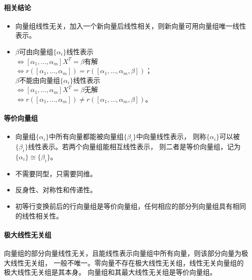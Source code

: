 \documentclass[
12pt, %
a4paper, 
oneside, %
headinclude,footinclude, %
]{scrartcl}
\begin{document}
\paragraph{相关结论}
\begin{itemize}
\item 向量组线性无关，加入一个新向量后线性相关，则新向量可用向量组唯一线性表示。
\item $ \beta $可由向量组$ \{\alpha_i\} $线性表示 \\
$ \Leftrightarrow $$ [\alpha_1, \dots, \alpha_m]X^T = \beta $有解 \\
$ \Leftrightarrow $$ r([\alpha_1, \dots, \alpha_m]) = r([\alpha_1, \dots, \alpha_m, \beta]) $； \\
$ \beta $不能由向量组$ \{\alpha_i\} $线性表示 \\
$ \Leftrightarrow $$ [\alpha_1, \dots, \alpha_m]X^T = \beta $无解 \\
$ \Leftrightarrow $$ r([\alpha_1, \dots, \alpha_m]) \neq r([\alpha_1, \dots, \alpha_m, \beta]) $。
\end{itemize}
\paragraph{等价向量组}
\begin{itemize}
\item 向量组$ \{\alpha_i\} $中所有向量都能被向量组$ \{\beta_i\} $中向量线性表示，
则称$ \{\alpha_i\} $可以被$ \{\beta_i\} $线性表示。若两个向量组能相互线性表示，
则二者是等价向量组，记为$ \{\alpha_i\} \cong \{\beta_i\} $。
\item 不需要同型，只需要同维。
\item 反身性、对称性和传递性。
\item 初等行变换前后的行向量组是等价向量组，任何相应的部分列向量组具有相同的线性相关性。
\end{itemize}
\paragraph{极大线性无关组}
向量组的部分向量线性无关，且能线性表示向量组中所有向量，则该部分向量为极大线性无关组，
一般不唯一。零向量不存在极大线性无关组，线性无关向量组的极大线性无关组是其本身。
向量组和其最大线性无关组是等价向量组。
\end{document}
